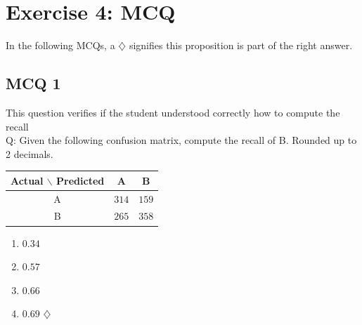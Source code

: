 \documentclass[a4paper, 10pt]{article}
\begin{document}
\section{Exercise 4: MCQ}
In the following MCQs, a $\diamondsuit$ signifies this proposition is part of the right answer.
\subsection{MCQ 1}
This question verifies if the student understood correctly how to compute the recall
\\
Q: Given the following confusion matrix, compute the recall of B. Rounded up to 2 decimals.
\begin{center}
    \begin{tabular}{ |c|c|c| }
        \hline
        Actual $\backslash$ Predicted & A & B \\
        \hline
        A & $ 314 $ & $ 159 $ \\
        B & $ 265 $ & $ 358 $ \\
        \hline
    \end{tabular}
\end{center}
\begin{enumerate}
    \item $0.34$
    \item $0.57$
    \item $0.66$
    \item $0.69$ $\diamondsuit$
\end{enumerate}
\end{document}
